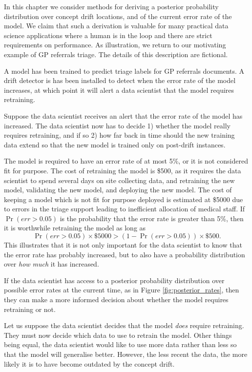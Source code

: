 In this chapter we consider methods for deriving a posterior probability distribution over concept drift locations, and of the current error rate of the model. We claim that such a derivation is valuable for many practical data science applications where a human is in the loop and there are strict requirements on performance. As illustration, we return to our motivating example of GP referrals triage. The details of this description are fictional.
\begin{displayquote}
    A model has been trained to predict triage labels for GP referrals documents. A drift detector is has been installed to detect when the error rate of the model increases, at which point it will alert a data scientist that the model requires retraining.   
    
    Suppose the data scientist receives an alert that the error rate of the model has increased. The data scientist now has to decide 1) whether the model really requires retraining, and if so 2) how far back in time should the new training data extend so that the new model is trained only on post-drift instances.
    
    The model is required to have an error rate of at most 5\%, or it is not considered fit for purpose. The cost of retraining the model is \$500, as it requires the data scientist to spend several days on site collecting data, and retraining the new model, validating the new model, and deploying the new model. The cost of keeping a model which is not fit for purpose deployed is estimated at \$5000 due to errors in the triage support  leading to inefficient allocation of medical staff. If $\Pr(err>0.05)$ is the probability that the error rate is greater than 5\%, then it is worthwhile retraining the model as long as 
    \begin{equation}
        \Pr(err>0.05) \times \$5000 > \left( 1-\Pr(err>0.05) \right) \times \$500.
    \end{equation}
    This illustrates that it is not only important for the data scientist to know that the error rate has probably increased, but to also have a probability distribution over {\it how much} it has increased. 
    
    If the data scientist has access to a posterior probability distribution over possible error rates at the current time, as in Figure \ref{fig:posterior_rates}, then they can make a more informed decision about whether the model requires retraining or not.   
    
    Let us suppose the data scientist decides that the model {\it does} require retraining. They must now decide which data to use to retrain the model. Other things being equal, the data scientist would like to use more data rather than less so that the model will generalise better. However, the less recent the data, the more likely it is to have become outdated by the concept drift.
    

\end{displayquote}
